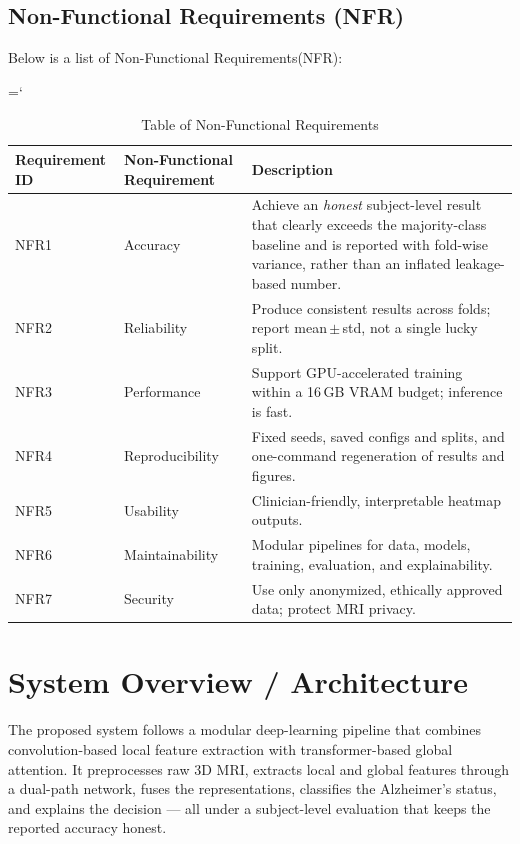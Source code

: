 \subsection{Non-Functional Requirements (NFR)}
Below is a list of Non-Functional Requirements(NFR):
\begin{sloppypar}
\hyphenchar\font=`\-
\begin{longtable}{|p{3cm}|p{5cm}|p{6.5cm}|}
\caption{Table of Non-Functional Requirements}\\
\hline
\textbf{Requirement ID} & \textbf{Non-Functional Requirement} & \textbf{Description}\\
\hline
NFR1 & Accuracy & Achieve an \emph{honest} subject-level result that clearly exceeds the majority-class baseline and is reported with fold-wise variance, rather than an inflated leakage-based number.\\
\hline
NFR2 & Reliability & Produce consistent results across folds; report mean\,$\pm$\,std, not a single lucky split.\\
\hline
NFR3 & Performance & Support GPU-accelerated training within a 16\,GB VRAM budget; inference is fast.\\
\hline
NFR4 & Reproducibility & Fixed seeds, saved configs and splits, and one-command regeneration of results and figures.\\
\hline
NFR5 & Usability & Clinician-friendly, interpretable heatmap outputs.\\
\hline
NFR6 & Maintainability & Modular pipelines for data, models, training, evaluation, and explainability.\\
\hline
NFR7 & Security & Use only anonymized, ethically approved data; protect MRI privacy.\\
\hline
\end{longtable}
\end{sloppypar}

\section{System Overview / Architecture}
The proposed system follows a modular deep-learning pipeline that combines convolution-based local feature extraction with transformer-based global attention. It preprocesses raw 3D MRI, extracts local and global features through a dual-path network, fuses the representations, classifies the Alzheimer's status, and explains the decision --- all under a subject-level evaluation that keeps the reported accuracy honest.

